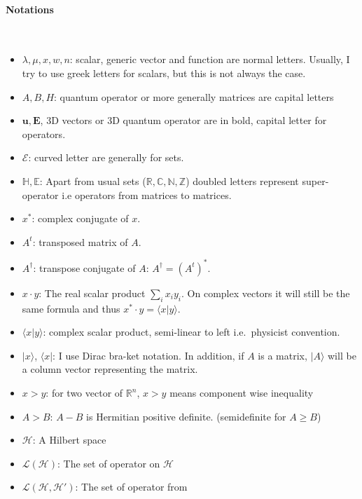 \documentclass[10pt,a4paper]{report}
\theoremstyle{plain}
\theoremstyle{definition}
\theoremstyle{remark}
\newcommand{\R}{\ensuremath{\mathbb{R}}}
\newcommand{\N}{\ensuremath{\mathbb{N}}}
\newcommand{\Z}{\ensuremath{\mathbb{Z}}}
\newcommand{\C}{\ensuremath{\mathbb{C}}}
\newcommand{\ket}[1]{|#1\rangle}
\newcommand{\bra}[1]{\langle#1|}
\newcommand{\braket}[2]{\langle#1|#2\rangle}
\renewcommand{\geq}{\geqslant}
\newcommand{\bs}{\boldsymbol}
\begin{document}
\vfill

\paragraph{\Huge Notations}


\

\vspace{1.5cm}

\begin{itemize}
  \item $\lambda,\mu,x,w,n$: scalar, generic vector and function are normal
    letters.
    Usually, I try to use greek letters for scalars, but this is not always the case.
  \item $A,B,H$: quantum operator or more generally matrices are capital letters
  \item $\bs u, \bs E$, 3D vectors or 3D quantum operator are in bold, capital
    letter for operators.
  \item $\mathcal{E}$: curved letter are generally for sets.
  \item $\mathbb H, \mathbb E$: Apart from usual sets ($\R,\C,\N,\Z$) doubled
    letters represent super-operator i.e operators from matrices to matrices.
  \item $x^*$: complex conjugate of $x$.
  \item $A^t$: transposed matrix of $A$.
  \item $A^\dagger$: transpose conjugate of $A$: $A^\dagger = {(A^t)}^*$.
  \item $x \cdot y$: The real scalar product $\sum_i x_i y_i$. On complex vectors it
    will still be the same formula and thus $x^* \cdot y = \braket x y$.
  \item $\braket x y$: complex scalar product, semi-linear to left i.e.\ physicist convention.
  \item $\ket x$, $\bra x$: I use Dirac bra-ket notation. In addition, if $A$
    is a matrix, $\ket A$ will be a column vector
    representing the matrix.
  \item $x > y$: for two vector of $\R^n$, $x > y$ means component wise inequality
  \item $A > B$: $A - B$ is Hermitian positive definite. (semidefinite for $A
    \geq B$)
  \item $\mathcal{H}$: A Hilbert space
  \item $\mathcal{L}(\mathcal{H})$: The set of operator on $\mathcal{H}$
  \item $\mathcal{L}(\mathcal{H}, \mathcal{H}')$: The set of operator from

\end{itemize}
\end{document}
